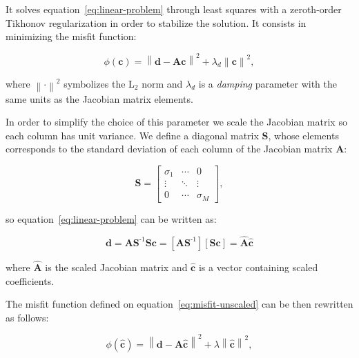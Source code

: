 \documentclass[twocolumn]{article}
\newcommand{\inv}{^{\text{-}1}}
\begin{document}
It solves equation~\ref{eq:linear-problem} through least squares with
a zeroth-order Tikhonov \citep{tikhonov1977} regularization in order to
stabilize the solution.
It consists in minimizing the misfit function:

\begin{equation}
    \phi(\mathbf{c}) =
        \left\lVert
            \mathbf{d} - \mathbf{A}\mathbf{c}
        \right\rVert ^ 2
        + \lambda_d \left\lVert \mathbf{c} \right\rVert ^2,
    \label{eq:misfit-unscaled}
\end{equation}

\noindent where $\left\lVert \cdot \right\rVert ^ 2$ symbolizes the L$_2$ norm
and $\lambda_d$ is a \emph{damping} parameter with the same units as the
Jacobian matrix elements.

In order to simplify the choice of this parameter we scale the Jacobian matrix
so each column has unit variance.
We define a diagonal matrix $\mathbf{S}$, whose elements corresponds to the
standard deviation of each column of the Jacobian matrix $\mathbf{A}$:

\begin{equation}
    \mathbf{S} =
    \begin{bmatrix}
        \sigma_1 & \cdots &0 \\
        \vdots & \ddots & \vdots \\
        0 & \cdots & \sigma_M
    \end{bmatrix}
    ,
\end{equation}

\noindent so equation~\ref{eq:linear-problem} can be written as:

\begin{equation}
    \mathbf{d}
    =
    \mathbf{A} \mathbf{S}\inv \mathbf{S} \mathbf{c}
    =
    \left[
        \mathbf{A} \mathbf{S}\inv
    \right]
    \left[
        \mathbf{S} \mathbf{c}
    \right]
    =
    \hat{\mathbf{A}} \hat{\mathbf{c}}
\end{equation}

\noindent where $\hat{\mathbf{A}}$ is the scaled Jacobian matrix and
$\hat{\mathbf{c}}$ is a vector containing scaled coefficients.

The misfit function defined on equation~\ref{eq:misfit-unscaled} can be then
rewritten as follows:

\begin{equation}
    \phi(\hat{\mathbf{c}}) =
        \left\lVert \mathbf{d}
        - \hat{\mathbf{A}}\hat{\mathbf{c}} \right\rVert ^ 2
        + \lambda \left\lVert \hat{\mathbf{c}} \right\rVert ^2,
    \label{eq:misfit}
\end{equation}
\end{document}
